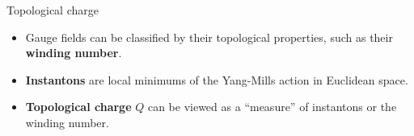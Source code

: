 \documentclass[10pt,show notes on second screen]{beamer}
\begin{document}
\begin{frame}{Topological charge}
\begin{itemize}
    \item <1->Gauge fields can be classified by their topological properties, such as their \textbf{winding number}.
    \item <2->\textbf{Instantons} are local minimums of the Yang-Mills action in Euclidean space.
    \item <3->\textbf{Topological charge} $Q$ can be viewed as a ``measure'' of instantons or the winding number.
\end{itemize}
\end{frame}
\end{document}
